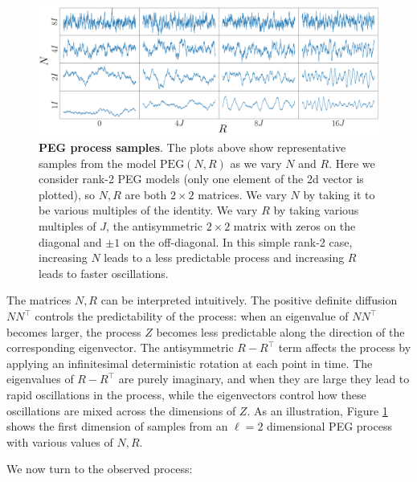 \documentclass{article}
\theoremstyle{definition}
\newcommand{\diffusion}{N}
\newcommand{\rotparm}{R}
\newcommand{\PEG}{\mathrm{PEG}}
\begin{document}
\begin{figure}[ht]
\vskip 0.2in
\begin{center}
\centerline{\includegraphics[width=2\columnwidth]{pics/exampleprocs}}
\caption{\textbf{PEG process samples}.  The plots above show representative samples from the model $\PEG(\diffusion,\rotparm)$ as we vary $\diffusion$ and $\rotparm$.  Here we consider rank-2 PEG models (only one element of the 2d vector is plotted), so $\diffusion,\rotparm$ are both $2\times 2$ matrices.   We vary $\diffusion$ by taking it to be various multiples of the identity.  We vary $\rotparm$ by taking various multiples of $J$, the antisymmetric $2\times 2$ matrix with zeros on the diagonal and $\pm 1$ on the off-diagonal.  In this simple rank-2 case, increasing $N$ leads to a less predictable process and  increasing $\rotparm$ leads to faster oscillations.
\label{fig:exampleprocs}}
\end{center}
\vskip -0.2in
\end{figure}
 

The matrices $\diffusion,\rotparm$ can be interpreted intuitively.  The positive definite diffusion $\diffusion \diffusion^\top$ controls the predictability of the process: when an eigenvalue of $\diffusion \diffusion^\top$ becomes larger, the process $Z$ becomes less predictable along the direction of the corresponding eigenvector.  The antisymmetric  $\rotparm-\rotparm^\top$ term affects the process by applying an infinitesimal deterministic rotation at each point in time.  The eigenvalues of $\rotparm - \rotparm^\top$ are purely imaginary, and when they are large they lead to rapid oscillations in the process, while the eigenvectors control how these oscillations are mixed across the dimensions of $Z$.  As an illustration, Figure \ref{fig:exampleprocs} shows the first dimension of samples from an $\ell=2$ dimensional PEG process with various values of $\diffusion,\rotparm$.

We now turn to the observed process: 
\end{document}
